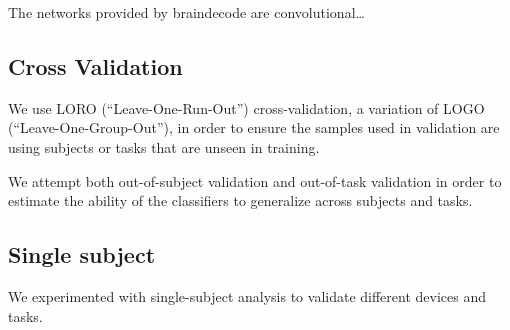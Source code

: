         The networks provided by braindecode are convolutional\ldots

    \subsection{Cross Validation}

        We use LORO (``Leave-One-Run-Out'') cross-validation, a variation of LOGO (``Leave-One-Group-Out''), in order to ensure the samples used in validation are using subjects or tasks that are unseen in training.

        We attempt both out-of-subject validation and out-of-task validation in order to estimate the ability of the classifiers to generalize across subjects and tasks.

    \subsection{Single subject}

        We experimented with single-subject analysis to validate different devices and tasks.
